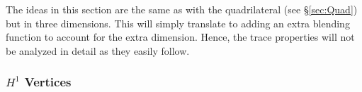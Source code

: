 The ideas in this section are the same as with the quadrilateral (see \S\ref{sec:Quad}) but in three dimensions.
This will simply translate to adding an extra blending function to account for the extra dimension.
Hence, the trace properties will not be analyzed in detail as they easily follow.

\subsubsection{\texorpdfstring{$H^1$}{H1} Vertices}
